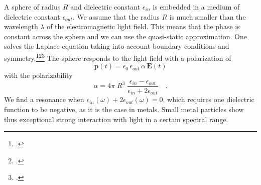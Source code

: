 A sphere of radius $R$ and dielectric constant $\epsilon_{in}$ is embedded in a medium of dielectric constant $\epsilon_{out}$. We assume that the radius $R$ is much smaller than the wavelength $\lambda$ of the electromagnetic light field. This means that the phase is constant across the sphere and we can use the quasi-static approximation. One solves the Laplace equation taking into account boundary conditions and symmetry.\footcite{Jackson-ED}\footcite[excercise 2.4.2]{Nolting-ED}\footcite[chapter 5.2]{BH-book}
The sphere responds to the light field with a polarization of
\begin{equation}
 \mathbf{p}(t) = \epsilon_0 \,  \epsilon_{out} \, \alpha \, \mathbf{E}(t)
\end{equation}
with the polarizability
\begin{equation}
 \alpha = 4 \pi  \; R^3 \; \frac{\epsilon_{in} - \epsilon_{out}}{\epsilon_{in} + 2 \epsilon_{out}} \quad .
\end{equation}
We find a resonance when $\epsilon_{in}(\omega) + 2 \epsilon_{out}(\omega) = 0$, which requires one dielectric function to be negative, as it is the case in metals. Small metal particles show thus exceptional strong interaction with light in a certain spectral range.





